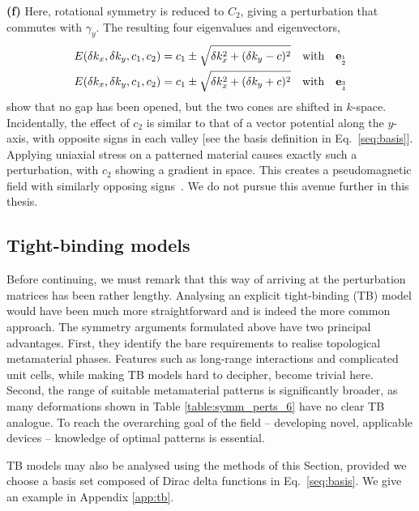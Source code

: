 \textbf{(f)} Here, rotational symmetry is reduced to $C_2$, giving a perturbation that commutes with $\gamma_y$. The resulting four eigenvalues and eigenvectors,
\begin{equation}
\begin{aligned}
E(\delta k_x, \delta k_y, c_1, c_2) &= c_1 \pm \sqrt{\delta k_x^2 + (\delta k_y - c)^2} \quad \text{with} \quad \vb{e}_{_{2}^{1}} \\
E(\delta k_x, \delta k_y, c_1, c_2) &= c_1 \pm \sqrt{\delta k_x^2 + (\delta k_y + c)^2} \quad \text{with} \quad \vb{e}_{_{4}^{3}} 
\end{aligned}
\end{equation}
show that no gap has been opened, but the two cones are shifted in $k$-space. Incidentally, the effect of $c_2$ is similar to that of a vector potential along the $y$-axis, with opposite signs in each valley [see the basis definition in Eq.~\eqref {seq:basis}]. Applying uniaxial stress on a patterned material causes exactly such a perturbation, with $c_2$ showing a gradient in space. This creates a pseudomagnetic field with similarly opposing signs~\cite{Jamadi_2020, Guglielmon_2021}. We do not pursue this avenue further in this thesis.


\subsection{Tight-binding models}

Before continuing, we must remark that this way of arriving at the perturbation matrices has been rather lengthy. Analysing an explicit tight-binding (TB) model would have been much more straightforward and is indeed the more common approach. The symmetry arguments formulated above have two principal advantages. First, they identify the bare requirements to realise topological metamaterial phases. Features such as long-range interactions and complicated unit cells, while making TB models hard to decipher, become trivial here. Second, the range of suitable metamaterial patterns is significantly broader, as many deformations shown in Table \ref{table:symm_perts_6} have no clear TB analogue. To reach the overarching goal of the field -- developing novel, applicable devices -- knowledge of optimal patterns is essential.

TB models may also be analysed using the methods of this Section, provided we choose a basis set composed of Dirac delta functions in Eq.~\eqref{seq:basis}. We give an example in Appendix \ref{app:tb}. 

